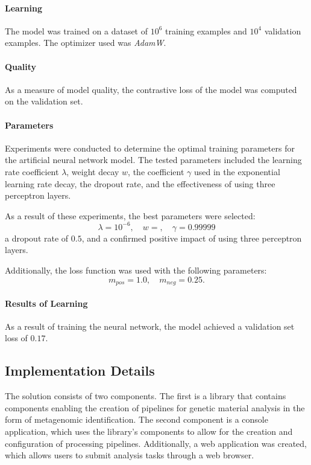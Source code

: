 \documentclass[pdflatex,sn-vancouver-num]{sn-jnl}%
\begin{document}
                \paragraph{Learning}
                The model was trained on a dataset of $10^{6}$ training examples and $10^{4}$ validation examples. The optimizer used was \textit{AdamW}\cite{Loshchilov2017DecoupledWD}.

                \paragraph{Quality}
                As a measure of model quality, the contrastive loss of the model was computed on the validation set.

                \paragraph{Parameters}
                Experiments were conducted to determine the optimal training parameters for the artificial neural network model. The tested parameters included the learning rate coefficient \( \lambda \), weight decay \( w \), the coefficient \( \gamma \) used in the exponential learning rate decay, the dropout rate, and the effectiveness of using three perceptron layers.

                As a result of these experiments, the best parameters were selected:
                \[
                \lambda = 10^{-6}, \quad w = , \quad \gamma = 0.99999
                \]
                a dropout rate of \( 0.5 \), and a confirmed positive impact of using three perceptron layers.

                Additionally, the loss function was used with the following parameters:
                \[
                m_{pos} = 1.0, \quad m_{neg} = 0.25.
                \]


                \paragraph{Results of Learning}
                As a result of training the neural network, the model achieved a validation set loss of $0.17$.


        \subsection{Implementation Details}
            The solution consists of two components. The first is a library that contains components enabling the creation of pipelines for genetic material analysis in the form of metagenomic identification. The second component is a console application, which uses the library's components to allow for the creation and configuration of processing pipelines. Additionally, a web application was created, which allows users to submit analysis tasks through a web browser.  
\end{document}
